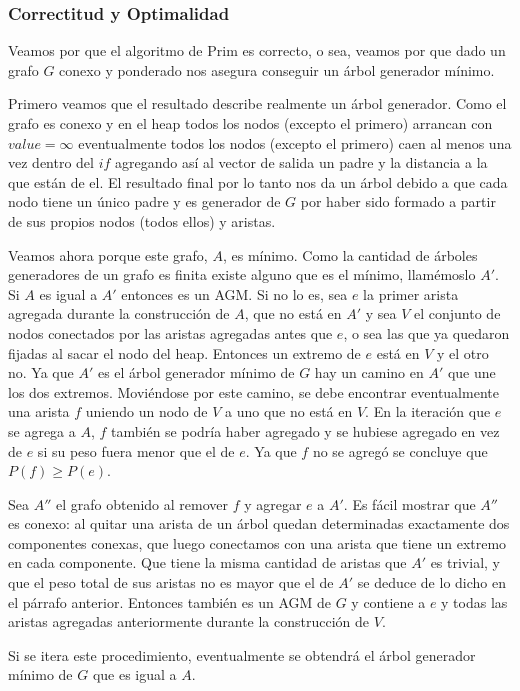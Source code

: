 \subsubsection{Correctitud y Optimalidad}

Veamos por que el algoritmo de Prim es correcto, o sea, veamos por que dado un grafo $G$ conexo y ponderado nos asegura conseguir un árbol generador mínimo.

Primero veamos que el resultado describe realmente un árbol generador. Como el grafo es conexo y en el heap todos los nodos (excepto el primero) arrancan con $value = \infty$  eventualmente todos los nodos (excepto el primero) caen al menos una vez dentro del $if$ agregando así al vector de salida un padre y la distancia a la que están de el. El resultado final por lo tanto nos da un árbol debido a que cada nodo tiene un único padre y es generador de $G$ por haber sido formado a partir de sus propios nodos (todos ellos) y aristas.

Veamos ahora porque este grafo, $A$, es mínimo.
Como la cantidad de árboles generadores de un grafo es finita existe alguno que es el mínimo, llam\'emoslo $A'$.
Si $A$ es igual a $A'$ entonces es un AGM.
Si no lo es, sea $e$ la primer arista agregada durante la construcción de $A$, que no está en $A'$ y sea $V$ el conjunto de nodos conectados por las aristas agregadas antes que $e$, o sea las que ya quedaron fijadas al sacar el nodo del heap.
Entonces un extremo de $e$ está en $V$ y el otro no. Ya que $A'$ es el árbol generador mínimo de $G$ hay un camino en $A'$ que une los dos extremos. Moviéndose por este camino, se debe encontrar eventualmente una arista $f$ uniendo un nodo de $V$ a uno que no está en $V$. En la iteración que $e$ se agrega a $A$, $f$ también se podría haber agregado y se hubiese agregado en vez de $e$ si su peso fuera menor que el de $e$. Ya que $f$ no se agregó se concluye que $P(f) \geq P(e)$.

Sea $A''$ el grafo obtenido al remover $f$ y agregar $e$ a $A'$. Es fácil mostrar que $A''$ es conexo: al quitar una arista de un árbol quedan determinadas exactamente dos componentes conexas, que luego conectamos con una arista que tiene un extremo en cada componente. Que tiene la misma cantidad de aristas que $A'$ es trivial, y que el peso total de sus aristas no es mayor que el de $A'$ se deduce de lo dicho en el párrafo anterior. Entonces también es un AGM de $G$ y contiene a $e$ y todas las aristas agregadas anteriormente durante la construcción de $V$. 

Si se itera este procedimiento, eventualmente se obtendrá el árbol generador mínimo de $G$ que es igual a $A$.

